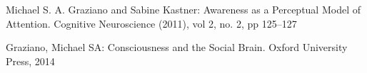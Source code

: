 \documentclass[citeauthoryear]{llncs}
\begin{document}
\begin{thebibliography}{}
%
\newcommand{\mytilde}{\raise.17ex\hbox{$\scriptstyle\mathtt{\sim}$}}










Michael S. A.   Graziano  and  Sabine   Kastner:
Awareness as a Perceptual Model of Attention.
Cognitive Neuroscience (2011), vol 2, no. 2, pp 125--127


Graziano, Michael SA:
Consciousness and the Social Brain.
Oxford University Press, 2014



\end{thebibliography}
\end{document}
